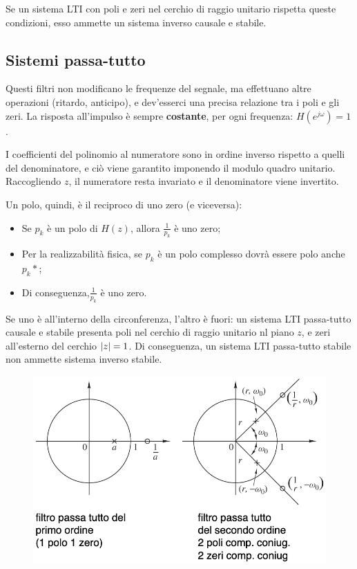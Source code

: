 Se un sistema LTI con poli e zeri nel cerchio di raggio unitario rispetta queste condizioni, esso ammette un sistema inverso causale e stabile.

\subsection{Sistemi passa-tutto}
Questi filtri non modificano le frequenze del segnale, ma effettuano altre operazioni (ritardo, anticipo), e dev'esserci una precisa relazione tra i poli e gli zeri. La risposta all'impulso è sempre \textbf{costante}, per ogni frequenza: $H(e^{j\omega}) = 1$.

I coefficienti del polinomio al numeratore sono in ordine inverso rispetto a quelli del denominatore, e ciò viene garantito imponendo il modulo quadro unitario. Raccogliendo $z$, il numeratore resta invariato e il denominatore viene invertito. 

Un polo, quindi, è il reciproco di uno zero (e viceversa):
\begin{itemize}
	\item Se $p_k$ è un polo di $H(z)$, allora $\frac{1}{p_k}$ è uno zero;
	\item Per la realizzabilità fisica, se $p_k$ è un polo complesso dovrà essere polo anche $p_k*$;
	\item Di conseguenza,$\frac{1}{p_k}$ è uno zero.
\end{itemize}

Se uno è all'interno della circonferenza, l'altro è fuori: un sistema LTI passa-tutto causale e stabile presenta poli nel cerchio di raggio unitario nl piano $z$, e zeri all'esterno del cerchio $\left|z\right| = 1$. Di conseguenza, un sistema LTI passa-tutto stabile non ammette sistema inverso stabile.

\begin{figure}[h]
	\centering
	\includegraphics[scale=0.4]{Lezioni/Immagini/passatutto}
\end{figure}


